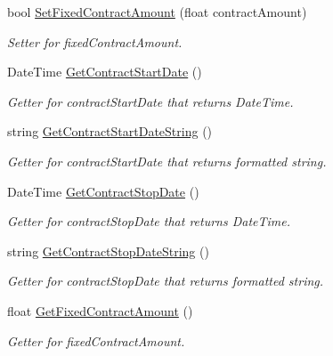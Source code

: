\begin{DoxyCompactItemize}
bool \hyperlink{class_all_employees_1_1_contract_employee_acf577438381bc6c56bc8f70ce0b25111}{Set\+Fixed\+Contract\+Amount} (float contract\+Amount)
\begin{DoxyCompactList}\small\item\em Setter for fixed\+Contract\+Amount. \end{DoxyCompactList}\item 
Date\+Time \hyperlink{class_all_employees_1_1_contract_employee_a270e070d2ccf2f707c9441f0ba1f2fad}{Get\+Contract\+Start\+Date} ()
\begin{DoxyCompactList}\small\item\em Getter for contract\+Start\+Date that returns Date\+Time. \end{DoxyCompactList}\item 
string \hyperlink{class_all_employees_1_1_contract_employee_a706f9a356995be719add2e1d522d1625}{Get\+Contract\+Start\+Date\+String} ()
\begin{DoxyCompactList}\small\item\em Getter for contract\+Start\+Date that returns formatted string. \end{DoxyCompactList}\item 
Date\+Time \hyperlink{class_all_employees_1_1_contract_employee_a98cacd6f03b693ba838b36c861c59b10}{Get\+Contract\+Stop\+Date} ()
\begin{DoxyCompactList}\small\item\em Getter for contract\+Stop\+Date that returns Date\+Time. \end{DoxyCompactList}\item 
string \hyperlink{class_all_employees_1_1_contract_employee_ada12137c290146af671d8e9b8db2b3fa}{Get\+Contract\+Stop\+Date\+String} ()
\begin{DoxyCompactList}\small\item\em Getter for contract\+Stop\+Date that returns formatted string. \end{DoxyCompactList}\item 
float \hyperlink{class_all_employees_1_1_contract_employee_add493d299c7d7ea7a8f8983aee2e5fa0}{Get\+Fixed\+Contract\+Amount} ()
\begin{DoxyCompactList}\small\item\em Getter for fixed\+Contract\+Amount. \end{DoxyCompactList}\end{DoxyCompactItemize}
